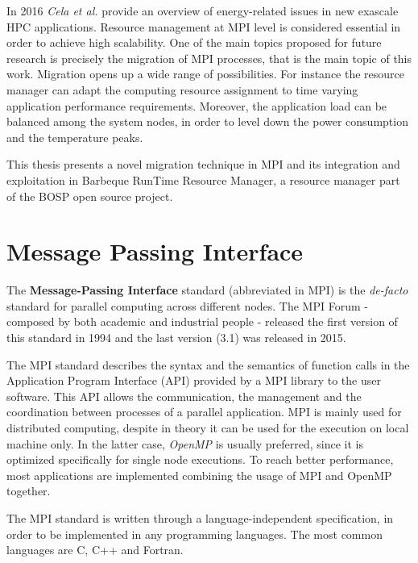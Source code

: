 In 2016 \emph{Cela et al.} provide an overview \cite{cela2016fostering} of
energy-related issues in new exascale HPC applications. Resource management
at MPI level is considered essential in order to achieve high scalability.
One of the main topics proposed for future research is precisely the migration
of MPI processes, that is the main topic of this work. Migration opens up a 
wide range of possibilities. For instance the resource manager can adapt the
computing resource assignment to time varying application performance
requirements. Moreover, the application load can be balanced among the system
nodes, in order to level down the power consumption and the temperature peaks.

This thesis presents a novel migration technique in MPI and its integration and
exploitation in Barbeque RunTime Resource Manager, a resource manager part of the BOSP open source project.

\section{Message Passing Interface}
The \textbf{Message-Passing Interface} standard (abbreviated in MPI) is
the \emph{de-facto} standard for parallel computing across different
nodes. 
The MPI Forum - composed by both academic and industrial
people - released the first version of this standard in 1994 and the last
version (3.1) was released in 2015\cite{mpistd}. 

The MPI standard describes the syntax and the semantics of function calls in
the Application Program Interface (API) provided by a MPI library to the user
software. This API allows the communication, the management and the
coordination between processes of a parallel application. MPI is mainly
used for distributed computing, despite in theory it can be used for the
execution on local machine only. In the latter case, \emph{OpenMP} is usually
preferred, since it is optimized specifically for single node executions.
To reach better performance, most applications are implemented combining
the usage of MPI and OpenMP together.

The MPI standard is written through
a language-independent specification, in order to be implemented in any
programming languages. The most common languages are C, C++ and Fortran.


